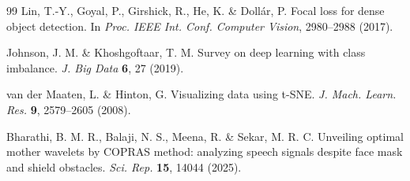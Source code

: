\documentclass[pdflatex,sn-nature,iicol]{sn-jnl}
\begin{document}
\begin{thebibliography}{99}
Lin, T.-Y., Goyal, P., Girshick, R., He, K. \& Doll\'ar, P. Focal loss for dense object detection. In \emph{Proc. IEEE Int. Conf. Computer Vision}, 2980--2988 (2017).

Johnson, J. M. \& Khoshgoftaar, T. M. Survey on deep learning with class imbalance. \emph{J. Big Data} \textbf{6}, 27 (2019).

van der Maaten, L. \& Hinton, G. Visualizing data using t-SNE. \emph{J. Mach. Learn. Res.} \textbf{9}, 2579--2605 (2008).

Bharathi, B. M. R., Balaji, N. S., Meena, R. \& Sekar, M. R. C. Unveiling optimal mother wavelets by COPRAS method: analyzing speech signals despite face mask and shield obstacles. \emph{Sci. Rep.} \textbf{15}, 14044 (2025).

\end{thebibliography}
\end{document}
